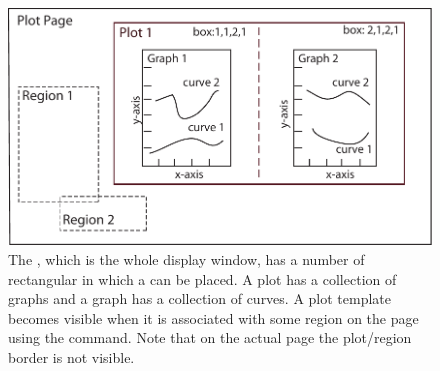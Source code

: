 \begin{figure}[bt]
  \centering
  \includegraphics[width=5.0in]{plot.pdf}
  \caption[Plotting nomenclature.]
{The , which is the whole display window, has a number of rectangular  in
which a  can be placed. A plot has a collection of graphs and a graph has a collection of curves. A plot
template becomes visible when it is associated with some region on the page using the 
command. Note that on the actual page the plot/region border is not visible.}
  \label{f:plot}
\end{figure}

